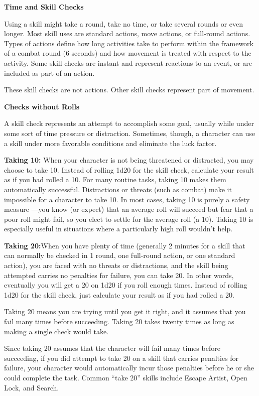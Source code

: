 \documentclass{article}
\begin{document}
\vspace{12pt}
\textbf{Time and Skill Checks}

Using a skill might take a round, take no time, or take several rounds or even 
longer. Most skill uses are standard actions, move actions, or full-round actions. 
Types of actions define how long activities take to perform within the framework 
of a combat round (6 seconds) and how movement is treated with respect to the activity. 
Some skill checks are instant and represent reactions to an event, or are included 
as part of an action.

These skill checks are not actions. Other skill checks represent part of movement.

\vspace{12pt}
\textbf{Checks without Rolls}

A skill check represents an attempt to accomplish some goal, usually while under 
some sort of time pressure or distraction. Sometimes, though, a character can use 
a skill under more favorable conditions and eliminate the luck factor.

\textbf{Taking 10: }When your character is not being threatened or distracted, 
you may choose to take 10. Instead of rolling 1d20 for the skill check, calculate 
your result as if you had rolled a 10. For many routine tasks, taking 10 makes 
them automatically successful. Distractions or threats (such as combat) make it 
impossible for a character to take 10. In most cases, taking 10 is purely a safety 
measure ---you know (or expect) that an average roll will succeed but fear that 
a poor roll might fail, so you elect to settle for the average roll (a 10). Taking 
10 is especially useful in situations where a particularly high roll wouldn't help.

\textbf{Taking 20:}When you have plenty of time (generally 2 minutes for a skill 
that can normally be checked in 1 round, one full-round action, or one standard 
action), you are faced with no threats or distractions, and the skill being attempted 
carries no penalties for failure, you can take 20. In other words, eventually you 
will get a 20 on 1d20 if you roll enough times. Instead of rolling 1d20 for the 
skill check, just calculate your result as if you had rolled a 20.

Taking 20 means you are trying until you get it right, and it assumes that you 
fail many times before succeeding. Taking 20 takes twenty times as long as making 
a single check would take.

Since taking 20 assumes that the character will fail many times before succeeding, 
if you did attempt to take 20 on a skill that carries penalties for failure, your 
character would automatically incur those penalties before he or she could complete 
the task. Common ``take 20'' skills include Escape Artist, Open Lock, and Search.
\end{document}

